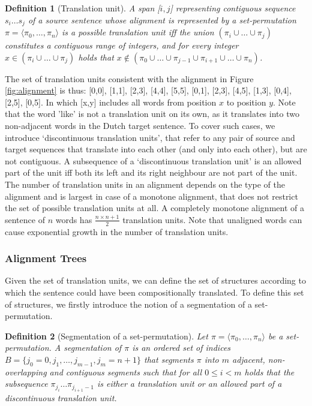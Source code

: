 \documentclass{report}
\theoremstyle{definition}
\theoremstyle{plain}
\newtheorem{definition}{Definition}
\begin{document}
\begin{definition}[Translation unit]
A span [$i,j$] representing contiguous sequence $s_i\ldots s_j$ of a source sentence whose alignment is represented by a set-permutation $\pi = \langle\pi_0 ,\ldots ,\pi_n\rangle$ is a possible translation unit iff the union $(\pi_i\cup \ldots \cup \pi_j)$ constitutes a contiguous range of integers, and for every integer $x \in (\pi_i\cup \ldots \cup\pi_j)$ holds that  $x \notin (\pi_0\cup \ldots \cup \pi_{j-1} \cup \pi_{i+1}\cup\ldots\cup \pi_n)$.
\end{definition}

The set of translation units consistent with the alignment in Figure \ref{fig:alignment} is thus: {[0,0], [1,1], [2,3], [4,4], [5,5], [0,1], [2,3], [4,5], [1,3], [0,4], [2,5], [0,5]}. In which [x,y] includes all words from position $x$ to position $y$. Note that the word 'like' is not a translation unit on its own, as it translates into two non-adjacent words in the Dutch target sentence. To cover such cases, we introduce `discontinuous translation units', that refer to any pair of source and target sequences that translate into each other (and only into each other), but are not contiguous. A subsequence of a `discontinuous translation unit' is an allowed part of the unit iff both its left and its right neighbour are not part of the unit.\\
The number of translation units in an alignment depends on the type of the alignment and is largest in case of a monotone alignment, that does not restrict the set of possible translation units at all. A completely monotone alignment of a sentence of $n$ words has $\frac{n\times n+1}{2}$ translation units. Note that unaligned words can cause exponential growth in the number of translation units.

\subsubsection{Alignment Trees} Given the set of translation units, we can define the set of structures according to which the sentence could have been compositionally translated. To define this set of structures, we firstly introduce the notion of a segmentation of a set-permutation.

\begin{definition}[Segmentation of a set-permutation]
Let $\pi = \langle \pi_0, \ldots,\pi_n\rangle$ be a set-permutation. A segmentation of $\pi$ is an ordered set of indices $B = \{j_0 = 0, j_1, \ldots ,j_{m-1},j_m = n+1\}$ that segments $\pi$ into $m$ adjacent, non-overlapping and contiguous segments such that for all $0\leq i < m$ holds that the subsequence $\pi_{j_i}\ldots\pi_{j_{i+1}-1}$ is either a translation unit or an allowed part of a discontinuous translation unit.
\end{definition}
\end{document}
